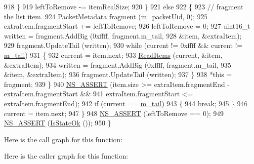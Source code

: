\begin{DoxyCode}
918             \}
919           leftToRemove -= itemRealSize;
920         \}
921       \textcolor{keywordflow}{else}
922         \{
923           \textcolor{comment}{// fragment the list item.}
924           \hyperlink{classns3_1_1PacketMetadata_a78447d800a9c3b6c85a3f38a09682b00}{PacketMetadata} fragment (\hyperlink{classns3_1_1PacketMetadata_ad97fbc08482c155bc4c11fdff820be86}{m\_packetUid}, 0);
925           extraItem.fragmentStart += leftToRemove;
926           leftToRemove = 0;
927           uint16\_t written = fragment.AddBig (0xffff, fragment.m\_tail,
928                                               &item, &extraItem);
929           fragment.UpdateTail (written);
930           \textcolor{keywordflow}{while} (current != 0xffff && current != \hyperlink{classns3_1_1PacketMetadata_ad24a659e236af7b98c475c97c4f60db9}{m\_tail})
931             \{
932               current = item.next;
933               \hyperlink{classns3_1_1PacketMetadata_a3719ad2c32313a9a1c74462322e8b517}{ReadItems} (current, &item, &extraItem);
934               written = fragment.AddBig (0xffff, fragment.m\_tail,
935                                          &item, &extraItem);
936               fragment.UpdateTail (written);
937             \}
938           *\textcolor{keyword}{this} = fragment;
939         \}
940       \hyperlink{assert_8h_a6dccdb0de9b252f60088ce281c49d052}{NS\_ASSERT} (item.size >= extraItem.fragmentEnd - extraItem.fragmentStart &&
941                  extraItem.fragmentStart <= extraItem.fragmentEnd);
942       \textcolor{keywordflow}{if} (current == \hyperlink{classns3_1_1PacketMetadata_ad24a659e236af7b98c475c97c4f60db9}{m\_tail})
943         \{
944           \textcolor{keywordflow}{break};
945         \}
946       current = item.next;
947     \}
948   \hyperlink{assert_8h_a6dccdb0de9b252f60088ce281c49d052}{NS\_ASSERT} (leftToRemove == 0);
949   \hyperlink{assert_8h_a6dccdb0de9b252f60088ce281c49d052}{NS\_ASSERT} (\hyperlink{classns3_1_1PacketMetadata_a208d3163e28704438cdd4d30318e489c}{IsStateOk} ());
950 \}
\end{DoxyCode}


Here is the call graph for this function\+:




Here is the caller graph for this function\+:



